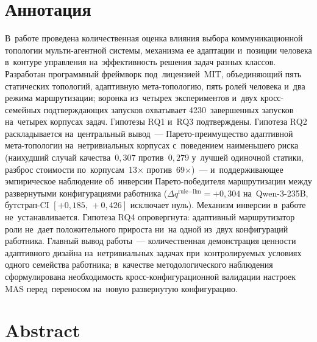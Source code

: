 
\section*{Аннотация}

В~работе проведена количественная оценка влияния выбора коммуникационной
топологии мульти-агентной системы, механизма ее адаптации и~позиции
человека в~контуре управления на~эффективность решения задач разных
классов. Разработан программный фреймворк под~лицензией~MIT, объединяющий
пять статических топологий, адаптивную мета-топологию, пять ролей человека
и~два режима маршрутизации; воронка из~четырех экспериментов и~двух
кросс-семейных подтверждающих запусков охватывает 4230~завершенных
запусков на~четырех корпусах задач. Гипотезы RQ1 и~RQ3 подтверждены.
Гипотеза RQ2 раскладывается на~центральный вывод~--- Парето-преимущество
адаптивной мета-топологии на~нетривиальных корпусах с~поведением
наименьшего риска (наихудший случай качества~$0{,}307$ против~$0{,}279$
у~лучшей одиночной статики, разброс стоимости по~корпусам~13$\times$
против~69$\times$)~--- и~поддерживающее эмпирическое наблюдение
об~инверсии Парето-победителя маршрутизации между развернутыми
конфигурациями работника ($\Delta q^{\text{rule}-\text{llm}}=+0{,}304$
на~Qwen-3-235B, бутстрап-CI $[+0{,}185,\,+0{,}426]$ исключает нуль).
Механизм инверсии в~работе не~устанавливается. Гипотеза RQ4 опровергнута:
адаптивный маршрутизатор роли не~дает положительного прироста ни~на одной
из~двух конфигураций работника. Главный вывод работы~--- количественная
демонстрация ценности адаптивного дизайна на~нетривиальных задачах
при~контролируемых условиях одного семейства работника; в~качестве
методологического наблюдения сформулирована необходимость
кросс-конфигурационной валидации настроек MAS перед~переносом на~новую
развернутую конфигурацию.

\vspace{1cm}

\section*{Abstract}

